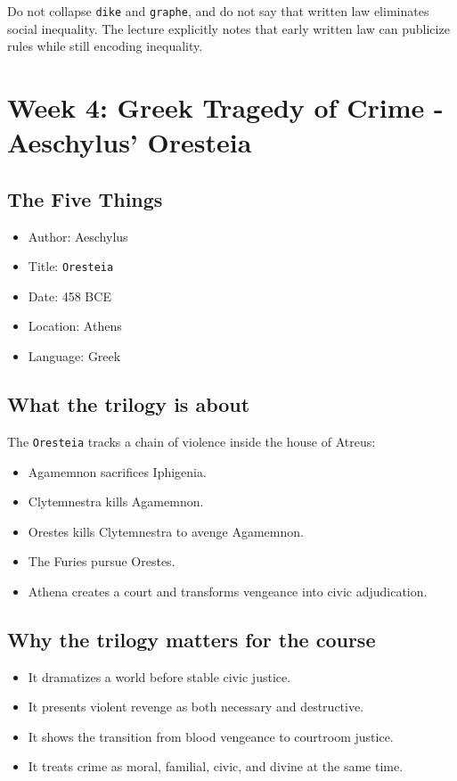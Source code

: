 \documentclass[11pt]{article}
\begin{document}
Do not collapse \texttt{dike} and \texttt{graphe}, and do not say that written law eliminates social inequality. The lecture explicitly notes that early written law can publicize rules while still encoding inequality.

\section{Week 4: Greek Tragedy of Crime - Aeschylus' Oresteia}

\subsection{The Five Things}

\begin{itemize}
\item Author: Aeschylus
\item Title: \texttt{Oresteia}
\item Date: 458 BCE
\item Location: Athens
\item Language: Greek
\end{itemize}

\subsection{What the trilogy is about}

The \texttt{Oresteia} tracks a chain of violence inside the house of Atreus:

\begin{itemize}
\item Agamemnon sacrifices Iphigenia.
\item Clytemnestra kills Agamemnon.
\item Orestes kills Clytemnestra to avenge Agamemnon.
\item The Furies pursue Orestes.
\item Athena creates a court and transforms vengeance into civic adjudication.
\end{itemize}

\subsection{Why the trilogy matters for the course}

\begin{itemize}
\item It dramatizes a world before stable civic justice.
\item It presents violent revenge as both necessary and destructive.
\item It shows the transition from blood vengeance to courtroom justice.
\item It treats crime as moral, familial, civic, and divine at the same time.
\end{itemize}
\end{document}
